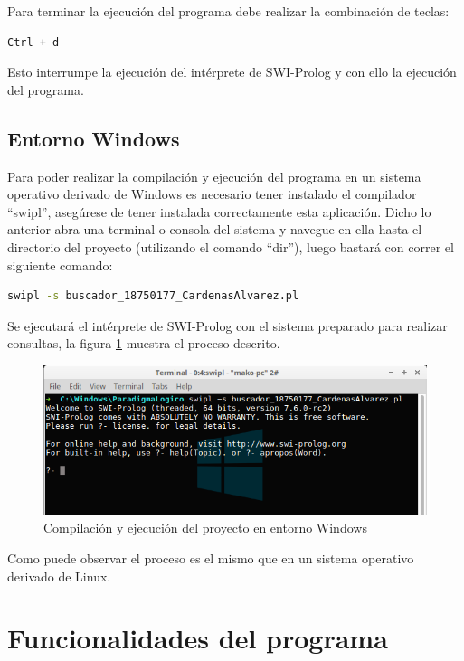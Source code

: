 \documentclass[letterpaper,12pt]{report}
\begin{document}
Para terminar la ejecución del programa debe realizar la combinación de teclas:

\begin{lstlisting}[language=bash]
Ctrl + d
\end{lstlisting}

Esto interrumpe la ejecución del intérprete de SWI-Prolog y con ello la ejecución del programa.

\section {Entorno Windows}

Para poder realizar la compilación y ejecución del programa en un sistema operativo derivado de Windows es necesario tener instalado el compilador ``swipl'', asegúrese de tener instalada correctamente esta aplicación. Dicho lo anterior abra una terminal o consola del sistema y navegue en ella hasta el directorio del proyecto (utilizando el comando ``dir''), luego bastará con correr el siguiente comando:

\begin{lstlisting}[language=bash]
swipl -s buscador_18750177_CardenasAlvarez.pl
\end{lstlisting}

Se ejecutará el intérprete de SWI-Prolog con el sistema preparado para realizar consultas, la figura \ref{fig:ejecWin} muestra el proceso descrito.

\begin{figure}[H]
    \centering
    \includegraphics[width=1\textwidth]{ejecWin.png}
    \caption{Compilación y ejecución del proyecto en entorno Windows}
    \label{fig:ejecWin}
\end{figure}

Como puede observar el proceso es el mismo que en un sistema operativo derivado de Linux.

\chapter{Funcionalidades del programa}
\end{document}
